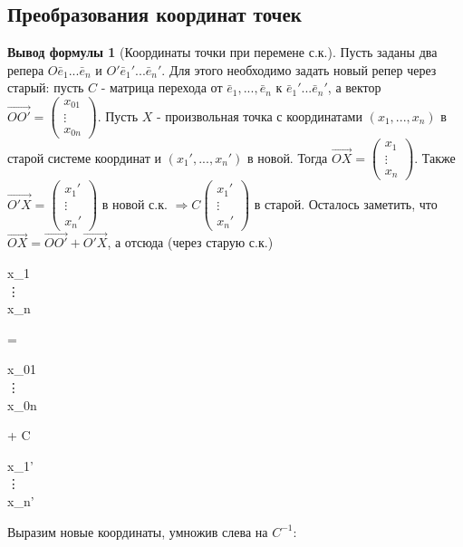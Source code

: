 \documentclass[a4paper, 12pt]{article}
\theoremstyle{definition}
\newtheorem*{formula}{Вывод формулы}
\newenvironment{boxedalign*}
  {\begin{equation*}\begin{lrbox}{\boxedalignbox}$\begin{aligned}}
  {\end{aligned}$\end{lrbox}\fbox{\usebox{\boxedalignbox}}\end{equation*}}
\begin{document}
	\subsection{Преобразования координат точек}
	\begin{formula}[Координаты точки при перемене с.к.]
		Пусть заданы два репера $O\bar{e}_{1}...\bar{e}_{n}$ и $O'\bar{e}_{1}'...\bar{e}_{n}'$. Для этого необходимо задать новый репер через старый: пусть $C$ - матрица перехода от $\bar{e}_{1},...,\bar{e}_{n}$ к $\bar{e}_{1}'...\bar{e}_{n}'$, а вектор $\overrightarrow{OO'} = \begin{pmatrix} x_{01} \\ \vdots \\ x_{0n} \end{pmatrix}$.
		Пусть $X$ - произвольная точка с координатами $(x_{1},...,x_{n})$ в старой системе координат и $(x_{1}',...,x_{n}')$ в новой. Тогда $\overrightarrow{OX} = \begin{pmatrix} x_{1} \\ \vdots \\ x_{n} \end{pmatrix}$. Также $\overrightarrow{O'X} = \begin{pmatrix} x_{1}' \\ \vdots \\ x_{n}' \end{pmatrix}$ в новой с.к. $\Rightarrow C\begin{pmatrix} x_{1}' \\ \vdots \\ x_{n}' \end{pmatrix}$ в старой. Осталось заметить, что $\overrightarrow{OX} = \overrightarrow{OO'} + \overrightarrow{O'X}$, а отсюда (через старую с.к.)
		\begin{boxedalign*}\begin{pmatrix} x_{1} \\ \vdots \\ x_{n} \end{pmatrix} = \begin{pmatrix} x_{01} \\ \vdots \\ x_{0n} \end{pmatrix} + C \begin{pmatrix} x_{1}' \\ \vdots \\ x_{n}' \end{pmatrix} \end{boxedalign*}
		Выразим новые координаты, умножив слева на $C^{-1}$:  

\end{formula}
\end{document}
